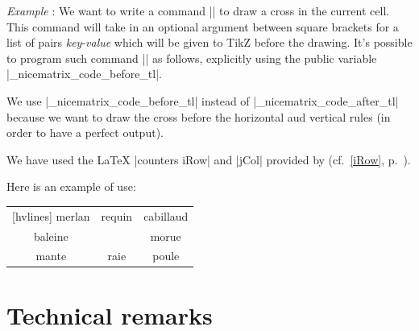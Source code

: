\documentclass[dvipsnames]{article}
\begin{document}
\bigskip
\emph{Example} : We want to write a command |\crossbox| to draw a cross in the
current cell. This command will take in an optional argument between square
brackets for a list of pairs \textsl{key}-\textsl{value} which will be given to
TikZ before the drawing.
It's possible to program such command |\crossbox| as follows, explicitly
using the public variable |\g_nicematrix_code_before_tl|.

We use |\g_nicematrix_code_before_tl| instead of |\g_nicematrix_code_after_tl| because
we want to draw the cross before the horizontal aud vertical rules (in order to have
a perfect output).


\begin{scope}

\medskip
{}


\medskip
We have used the  LaTeX |counters iRow| and |jCol| provided by 
(cf.~\ref{iRow}, p.~\pageref{iRow}).

\bigskip
Here is an example of use:

\medskip
\begin{Code}[width=9cm,show-output]
\begin{NiceTabular}{ccc}[hvlines]
\CodeBefore
\Body
  merlan & requin & cabillaud \\
  baleine & \emph{\crossbox[red]} & morue \\
  mante & raie & poule 
\end{NiceTabular}
\end{Code}

\end{scope}


\section{Technical remarks}
\end{document}
